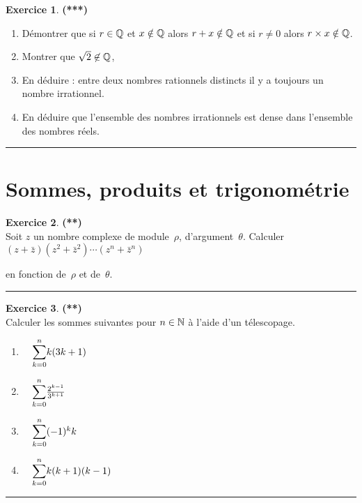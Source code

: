 \documentclass[a4paper,11pt]{article}
\theoremstyle{definition}
\newtheorem{exo}{Exercice} %
\begin{document}
\begin{exo}\textbf{(***)}\quad\\[0.2cm]
	\begin{enumerate}
		\item D\'emontrer que si $r \in \mathbb{Q}$ et $ x \notin \mathbb{Q} $ alors $ r+x
		\notin \mathbb{Q} $ et si $r\not= 0$ alors $ r\times x \notin \mathbb{Q} $.
		\item Montrer que $\sqrt 2 \not\in\mathbb{Q}$,
		\item En d\'eduire : entre deux nombres rationnels distincts il y a toujours un nombre irrationnel.
		\item En déduire que l'ensemble des nombres irrationnels est dense dans l'ensemble des nombres réels. 
	\end{enumerate}
	\centering
	\rule{1\linewidth}{0.6pt}
\end{exo}
\section*{Sommes, produits et trigonométrie}

\begin{exo}\textbf{(**)}\quad\\[0.2cm]
	Soit $z$ un nombre complexe de module~$\rho$, d'argument~$\theta$. Calculer \ $(z+\bar{z})(z^2+\bar{z}^2) \cdots (z^n+\bar{z}^n)
	$
	
	\raggedright en fonction de~$\rho$ et de~$\theta$.
	
	
	
	\centering
	\rule{1\linewidth}{0.6pt}
\end{exo}

\begin{exo}\textbf{(**)}\quad\\[0.2cm]
	Calculer les sommes suivantes pour $n\in\mathbb{N}$ à l'aide d'un télescopage.
	\begin{multicols}{2}
		\begin{enumerate}
			\item$ \quad\mathlarger\sum\limits_{k=0}^{n}k(3k+1)$
			\item$ \quad\mathlarger\sum\limits_{k=0}^{n} \frac{2^{k-1}}{3^{k+1}}$
			\item$ \quad\mathlarger\sum\limits_{k=0}^{n}(-1)^kk$
			\item$ \quad\mathlarger\sum\limits_{k=0}^{n}k(k+1)(k-1)$
		\end{enumerate}
		
	\end{multicols}
	
	\centering
	\rule{1\linewidth}{0.6pt}
\end{exo}
\end{document}
